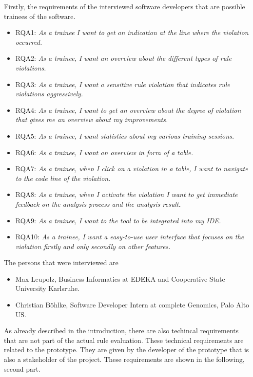 Firstly, the requirements of the interviewed software developers that are possible trainees of the software. 
\begin{itemize}
  \item RQA1: \textit{As a trainee I want to get an indication at the line where the violation occurred.}
  \item RQA2: \textit{As a trainee, I want an overview about the different types of rule violations.}
  \item RQA3: \textit{As a trainee, I want a sensitive rule violation that indicates rule violations aggressively.}
  \item RQA4: \textit{As a trainee, I want to get an overview about the degree of violation that gives me an overview about my improvements.}
  \item RQA5: \textit{As a trainee, I want statistics about my various training sessions.}
  \item RQA6: \textit{As a trainee, I want an overview in form of a table.}
  \item RQA7: \textit{As a trainee, when I click on a violation in a table, I want to navigate to the code line of the violation.}
  \item RQA8: \textit{As a trainee, when I activate the violation I want to get immediate feedback on the analysis process and the analysis result.}
  \item RQA9: \textit{As a trainee, I want to the tool to be integrated into my \acf{IDE}.}
  \item RQA10: \textit{As a trainee, I want a easy-to-use user interface that focuses on the violation firstly and only secondly on other features.}
\end{itemize}

The persons that were interviewed are
\begin{itemize}
  \item Max Leupolz, Business Informatics at EDEKA and Cooperative State University Karlsruhe. 
  \item Christian Böhlke, Software Developer Intern at complete Genomics, Palo Alto US. 
\end{itemize}

As already described in the introduction, there are also techincal requirements that are not part of the actual rule evaluation. These technical requirements are related to the prototype. They are given by the developer of the prototype that is also a stakeholder of the project. These requirements are shown in the following, second part. 

